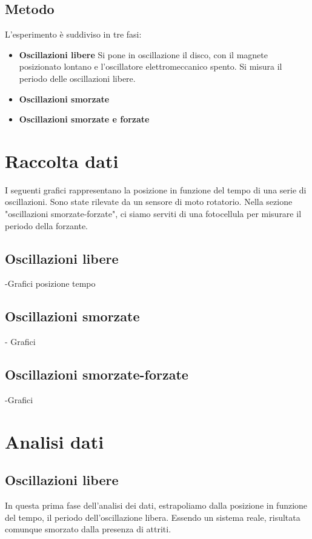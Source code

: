 \documentclass[a4paper,10pt]{report}
\begin{document}
\subsection{Metodo}
L'esperimento è suddiviso in tre fasi:

\begin{itemize}
\item \textbf{Oscillazioni libere}
Si pone in oscillazione il disco, con il magnete  posizionato lontano e l'oscillatore elettromeccanico spento. Si misura il periodo delle oscillazioni libere.
\item  \textbf{Oscillazioni smorzate}

\item \textbf{Oscillazioni smorzate e forzate}
\end{itemize}

\section{Raccolta dati}

I seguenti grafici rappresentano la posizione in funzione del tempo di una serie di oscillazioni. Sono state rilevate da un sensore di moto rotatorio.
Nella sezione "oscillazioni smorzate-forzate", ci siamo serviti di una fotocellula per misurare il periodo della forzante.

\subsection{Oscillazioni libere}

-Grafici posizione tempo 

\subsection{Oscillazioni smorzate}

- Grafici 
\subsection{Oscillazioni smorzate-forzate}

-Grafici

\section{Analisi dati}

\subsection{Oscillazioni libere}
In questa prima fase dell'analisi dei dati, estrapoliamo dalla posizione in funzione del tempo, il periodo dell'oscillazione libera. Essendo un sistema reale, risultata comunque smorzato dalla presenza di attriti. 
\end{document}
